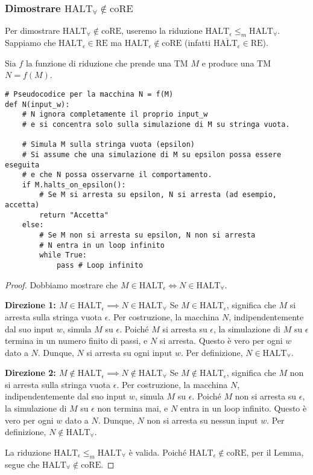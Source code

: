\documentclass[a4paper]{article}
\theoremstyle{definition} %
\begin{document}
\subsubsection{Dimostrare $\text{HALT}_\forall \notin \text{coRE}$}
Per dimostrare $\text{HALT}_\forall \notin \text{coRE}$, useremo la riduzione $\text{HALT}_\epsilon \le_m \text{HALT}_\forall$.
Sappiamo che $\text{HALT}_\epsilon \in \text{RE}$ ma $\text{HALT}_\epsilon \notin \text{coRE}$ (infatti $\overline{\text{HALT}_\epsilon} \in \text{RE}$).

Sia $f$ la funzione di riduzione che prende una TM $M$ e produce una TM $N = f(M)$.
\begin{verbatim}
# Pseudocodice per la macchina N = f(M)
def N(input_w):
    # N ignora completamente il proprio input_w
    # e si concentra solo sulla simulazione di M su stringa vuota.
    
    # Simula M sulla stringa vuota (epsilon)
    # Si assume che una simulazione di M su epsilon possa essere eseguita
    # e che N possa osservarne il comportamento.
    if M.halts_on_epsilon():
        # Se M si arresta su epsilon, N si arresta (ad esempio, accetta)
        return "Accetta"
    else:
        # Se M non si arresta su epsilon, N non si arresta
        # N entra in un loop infinito
        while True:
            pass # Loop infinito
\end{verbatim}

\begin{proof}
Dobbiamo mostrare che $M \in \text{HALT}_\epsilon \iff N \in \text{HALT}_\forall$.

\textbf{Direzione 1: $M \in \text{HALT}_\epsilon \implies N \in \text{HALT}_\forall$}
Se $M \in \text{HALT}_\epsilon$, significa che $M$ si arresta sulla stringa vuota $\epsilon$.
Per costruzione, la macchina $N$, indipendentemente dal suo input $w$, simula $M$ su $\epsilon$. Poiché $M$ si arresta su $\epsilon$, la simulazione di $M$ su $\epsilon$ termina in un numero finito di passi, e $N$ si arresta.
Questo è vero per ogni $w$ dato a $N$. Dunque, $N$ si arresta su ogni input $w$. Per definizione, $N \in \text{HALT}_\forall$.

\textbf{Direzione 2: $M \notin \text{HALT}_\epsilon \implies N \notin \text{HALT}_\forall$}
Se $M \notin \text{HALT}_\epsilon$, significa che $M$ non si arresta sulla stringa vuota $\epsilon$.
Per costruzione, la macchina $N$, indipendentemente dal suo input $w$, simula $M$ su $\epsilon$. Poiché $M$ non si arresta su $\epsilon$, la simulazione di $M$ su $\epsilon$ non termina mai, e $N$ entra in un loop infinito.
Questo è vero per ogni $w$ dato a $N$. Dunque, $N$ non si arresta su nessun input $w$. Per definizione, $N \notin \text{HALT}_\forall$.

La riduzione $\text{HALT}_\epsilon \le_m \text{HALT}_\forall$ è valida.
Poiché $\text{HALT}_\epsilon \notin \text{coRE}$, per il Lemma, segue che $\text{HALT}_\forall \notin \text{coRE}$.
\end{proof}
\end{document}
